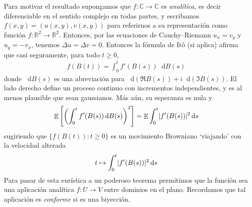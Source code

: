 \documentclass{report}
\newcommand{\ito}{Itô}
\newcommand{\brownian}{B}
\newcommand{\dd}{\mathop{}\!\mathrm{d}}
\newcommand{\realNumbers}{\mathbb{R}}
\newcommand{\complexNumbers}{\mathbb{C}}
\DeclareMathOperator{\Expectation}{\mathbb{E}}
\DeclarePairedDelimiter{\abs}{\lvert}{\rvert}
\theoremstyle{plain}
\theoremstyle{remark}
\theoremstyle{definition}
\begin{document}
Para motivar el resultado supongamos que \(f : \complexNumbers \rightarrow \complexNumbers\) es \emph{analítica}, es decir diferenciable en el sentido complejo en todas partes, y escribamos \(f(x, y) = (u(x, y), v(x, y))\) para referirnos a su representación como función \(f : \realNumbers^2 \rightarrow \realNumbers^2\).
Entonces, por las ecuaciones de Cauchy--Riemann \(u_x = v_y\) y \(u_y = - v_x\), tenemos \(\Delta u = \Delta v = 0\).
Entonces la fórmula de \ito{} (si aplica) afirma que casi seguramente, para todo \(t \geq 0\),
\begin{align}
  f(\brownian(t))
  =
  \int_0^t f'(\brownian(s)) \dd \brownian(s)
\end{align}
donde \(\dd \brownian(s)\) es una abreviación para \(\dd (\Re \brownian(s)) + i \dd (\Im \brownian(s))\).
El lado derecho define un proceso continuo con incrementos independientes, y es al menos plausible que sean gaussianos.
Más aún, su esperanza es nula y
\begin{align}
  \Expectation \left[ \left( \int_0^t f'(\brownian(s)) \dd \brownian(s) \right)^2 \right]
  =
  \Expectation \int_0^t \abs{f'(\brownian(s))}^2 \dd s
\end{align}
sugiriendo que \(\{f(\brownian(t)) : t \geq 0\}\) es un movimiento Browniano `viajando' con la velocidad alterada
\begin{align}
  t
  \mapsto
  \int_0^t \abs{f'(\brownian(s))}^2 \dd s
\end{align}
Para pasar de esta eurística a un poderoso teorema permitimos que la función sea una aplicación analítica \(f : U \rightarrow V\) entre dominios en el plano.
Recordamos que tal aplicación es \emph{conforme} si es una biyección.
\end{document}
